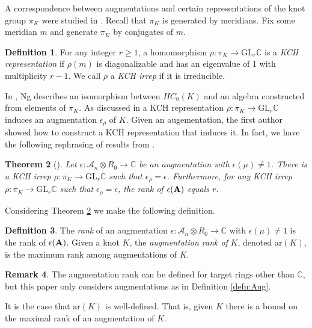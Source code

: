 \documentclass[11pt]{amsart}
\def\C{{\mathbb C}}
\def\A{{\mathcal A}}
\newtheorem{thm}{Theorem}[section]
\theoremstyle{definition}
\newtheorem{defn}[thm]{Definition}
\newtheorem{rem}[thm]{Remark}
\begin{document}
  A correspondence between augmentations and certain representations of the knot group $\pi_K$ were studied in \cite{Cor13a}. Recall that $\pi_K$ is generated by meridians. Fix some meridian $m$ and generate $\pi_K$ by conjugates of $m$.

  \begin{defn}
  For any integer $r\ge1$, a homomorphism $\rho:\pi_K\to\text{GL}_r\C$ is a \emph{KCH representation} if $\rho(m)$ is diagonalizable and has an eigenvalue of 1 with multiplicity $r-1$. We call $\rho$ a \emph{KCH irrep} if it is irreducible.
  \label{defn:KCHReps}
  \end{defn}

  In \cite{Ng08}, Ng describes an isomorphism between $HC_0(K)$ and an algebra constructed from elements of $\pi_K$. As discussed in \cite{Ng12} a KCH representation $\rho:\pi_K\to\text{GL}_r\C$ induces an augmentation $\epsilon_\rho$ of $K$. Given an augementation, the first author showed how to construct a KCH representation that induces it. In fact, we have the following rephrasing of results from \cite{Cor13a}.

  \begin{thm}[\cite{Cor13a}]
  Let $\epsilon:\A_n\otimes R_0\to\C$ be an augmentation with $\epsilon(\mu)\ne 1$. There is a KCH irrep $\rho:\pi_K\to\text{GL}_r\C$ such that $\epsilon_\rho=\epsilon$. Furthermore, for any KCH irrep $\rho:\pi_K\to\text{GL}_r\C$ such that $\epsilon_\rho = \epsilon$, the rank of $\epsilon({\bf A})$ equals $r$.
  \label{thm:AugKCH_Corresp}
  \end{thm}

  Considering Theorem \ref{thm:AugKCH_Corresp} we make the following definition.

  \begin{defn}
  The \emph{rank} of an augmentation $\epsilon:\A_n\otimes R_0\to\C$ with $\epsilon(\mu)\ne 1$ is the rank of $\epsilon({\bf A})$. Given a knot $K$, the \emph{augmentation rank of} $K$, denoted $\text{ar}(K)$, is the maximum rank among augmentations of $K$.
  \label{defn:AugRk}
  \end{defn}

  \begin{rem} The augmentation rank can be defined for target rings other than $\C$, but this paper only considers augmentations as in Definition \ref{defn:Aug}.
  \end{rem}

  It is the case that $\text{ar}(K)$ is well-defined. That is, given $K$ there is a bound on the maximal rank of an augmentation of $K$.
\end{document}
